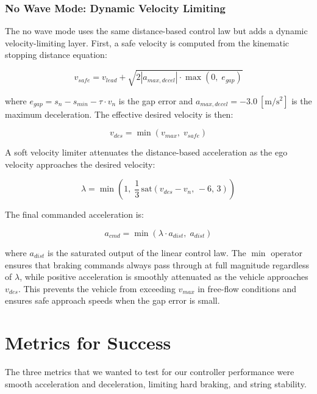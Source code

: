 \documentclass[conference]{IEEEtran}
\begin{document}
\subsubsection{No Wave Mode: Dynamic Velocity Limiting}

The no wave mode uses the same distance-based control law but adds a dynamic velocity-limiting layer. First, a safe velocity is computed from the kinematic stopping distance equation:

\begin{equation}
    v_{safe} = v_{lead} + \sqrt{2 \left| a_{max,decel} \right| \cdot \max(0,\; e_{gap})}
\end{equation}

where $e_{gap} = s_n - s_{min} - \tau \cdot v_n$ is the gap error and $a_{max,decel} = -3.0~\mathrm{[m/s^2]}$ is the maximum deceleration. The effective desired velocity is then:

\begin{equation}
    v_{des} = \min(v_{max},\; v_{safe})
\end{equation}

A soft velocity limiter attenuates the distance-based acceleration as the ego velocity approaches the desired velocity:

\begin{equation}
    \lambda = \min\!\left(1,\; \frac{1}{3}\,\text{sat}(v_{des} - v_n,\, -6,\, 3)\right)
\end{equation}

The final commanded acceleration is:

\begin{equation}
    a_{cmd} = \min(\lambda \cdot a_{dist},\; a_{dist})
\end{equation}

where $a_{dist}$ is the saturated output of the linear control law. The $\min$ operator ensures that braking commands always pass through at full magnitude regardless of $\lambda$, while positive acceleration is smoothly attenuated as the vehicle approaches $v_{des}$. This prevents the vehicle from exceeding $v_{max}$ in free-flow conditions and ensures safe approach speeds when the gap error is small.

\section{Metrics for Success}

The three metrics that we wanted to test for our controller performance were smooth acceleration and deceleration, limiting hard braking, and string stability.
\end{document}
